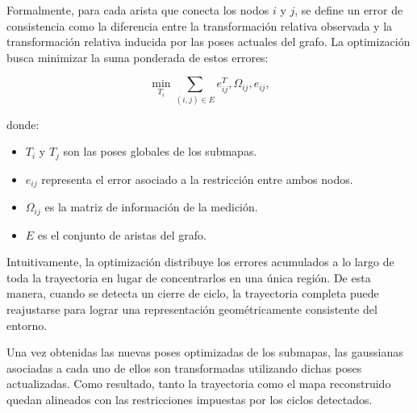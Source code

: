 Formalmente, para cada arista que conecta los nodos $i$ y $j$, se define un error de consistencia como la diferencia entre la transformación relativa observada y la transformación relativa inducida por las poses actuales del grafo. La optimización busca minimizar la suma ponderada de estos errores:

\[
\min_{{T_i}}
\sum_{(i,j)\in E}
e_{ij}^{T},\Omega_{ij},e_{ij},
\]

\noindent donde:

\begin{itemize}
\item $T_i$ y $T_j$ son las poses globales de los submapas.
\item $e_{ij}$ representa el error asociado a la restricción entre ambos nodos.
\item $\Omega_{ij}$ es la matriz de información de la medición.
\item $E$ es el conjunto de aristas del grafo.
\end{itemize}

Intuitivamente, la optimización distribuye los errores acumulados a lo largo de toda la trayectoria en lugar de concentrarlos en una única región. De esta manera, cuando se detecta un cierre de ciclo, la trayectoria completa puede reajustarse para lograr una representación geométricamente consistente del entorno.

Una vez obtenidas las nuevas poses optimizadas de los submapas, las gaussianas asociadas a cada uno de ellos son transformadas utilizando dichas poses actualizadas. Como resultado, tanto la trayectoria como el mapa reconstruido quedan alineados con las restricciones impuestas por los ciclos detectados.

